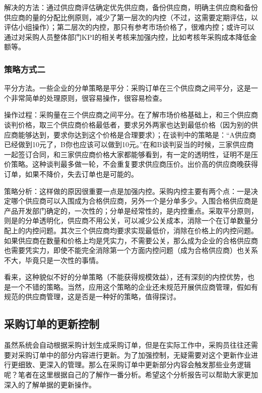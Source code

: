         解决的方法：通过供应商评估确定优先供应商，备份供应商，明确主供应商和备份供应商的量的分配比例原则，减少了第一层次的内控（不过，这需要定期评估，以评估小组操作）；第二层次的内控，那只有参考市场价格了，很难内控；或许可以通过对采购人员整体部门KPI的相关考核来加强内控，比如考核年采购成本降低金额等。

    \subsubsection {策略方式二}

        平分方法。一些企业的分单策略是平分：采购订单在三个供应商之间平分，这是一个非常简单的处理原则，很容易操作，很容易检查。

        操作过程：采购量在三个供应商之间平分。在了解市场价格基础上，和三个供应商谈判价格，取三个供应商价格最低者，要求另外两家也达到最低价格（因为别的供应商能够达到，要求你达到这个价格是合理要求）；在谈判中的策略是：“A供应商已经做到10元了，B你也应该可以做到10元。”在和B谈判妥当的时候，三家供应商一起签订合同，和三家供应商价格大家都能够看到，有一定的透明性，证明不是压价策略。这种谈判最多做一轮，不会重复要求供应商压价。出价高的供应商晚获得订单，如果不降价，失去订单也是可能的。

        策略分析：这样做的原因很重要一点是加强内控。采购内控主要有两个点：一是决定哪个供应商可以入围成为合格供应商，另外一个是分单多少。入围合格供应商是产品开发部门确定的，一次性的；分单是经常性的，是内控重点。采取平分原则，则是的分单透明化，供应商不用公关，可以减少公关成本，消除一个在订单数量分配上的内控问题。其次三个供应商均要求实现最低价，消除在价格上的内控问题。如果供应商在数量和价格上均是凭实力，不需要公关，那么成为企业的合格供应商也需要凭实力，即使不能完全消除第一个方面内控问题（成为合格供应商）也关系不大，毕竟只是一次性的事情。

        看来，这种貌似不好的分单策略（不能获得规模效益），还有深刻的内控优势，也是一个不错的策略。当然，应用这个策略的企业还未规范开展供应商管理，假如有规范的供应商管理，这是否是一种好的策略，值得探讨。

\subsection {采购订单的更新控制}

    虽然系统会自动根据采购计划生成采购订单，但是在实际工作中，采购员往往还需要对采购订单中的部分内容进行更新。为了加强控制，无疑需要对这个更新作业进行更细致、更深入的管理。那么在采购订单中更新部分内容会触发那些业务逻辑呢？笔者在这里根据自己的了解作一番分析。希望这个分析报告可以帮助大家更加深入的了解单据的更新操作。

